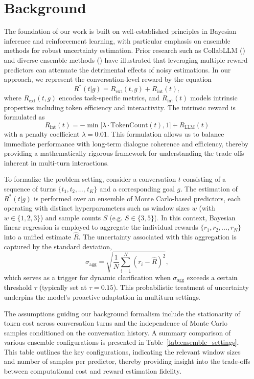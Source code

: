 \documentclass{article} %
\begin{document}
\section{Background}
The foundation of our work is built on well-established principles in Bayesian inference and reinforcement learning, with particular emphasis on ensemble methods for robust uncertainty estimation. Prior research such as CollabLLM (\cite{wu2025collabllm}) and diverse ensemble methods (\cite{nguyen2024laser}) have illustrated that leveraging multiple reward predictors can attenuate the detrimental effects of noisy estimations. In our approach, we represent the conversation-level reward by the equation 
\[
R^*(t|g) = R_{\text{ext}}(t, g) + R_{\text{int}}(t),
\]
where \(R_{\text{ext}}(t, g)\) encodes task-specific metrics, and \(R_{\text{int}}(t)\) models intrinsic properties including token efficiency and interactivity. The intrinsic reward is formulated as 
\[
R_{\text{int}}(t) = -\min\bigl[\lambda\cdot \text{TokenCount}(t), 1\bigr] + R_{\text{LLM}}(t)
\]
with a penalty coefficient \(\lambda=0.01\). This formulation allows us to balance immediate performance with long-term dialogue coherence and efficiency, thereby providing a mathematically rigorous framework for understanding the trade-offs inherent in multi-turn interactions.

To formalize the problem setting, consider a conversation \(t\) consisting of a sequence of turns \(\{t_1, t_2, \ldots, t_K\}\) and a corresponding goal \(g\). The estimation of \(R^*(t|g)\) is performed over an ensemble of Monte Carlo-based predictors, each operating with distinct hyperparameters such as window sizes \(w\) (with \(w \in \{1,2,3\}\)) and sample counts \(S\) (e.g. \(S \in \{3,5\}\)). In this context, Bayesian linear regression is employed to aggregate the individual rewards \(\{r_1, r_2, \ldots, r_N\}\) into a unified estimate \(\hat{R}\). The uncertainty associated with this aggregation is captured by the standard deviation,
\[
\sigma_{\text{agg}} = \sqrt{\frac{1}{N}\sum_{i=1}^N (r_i - \hat{R})^2},
\]
which serves as a trigger for dynamic clarification when \(\sigma_{\text{agg}}\) exceeds a certain threshold \(\tau\) (typically set at \(\tau=0.15\)). This probabilistic treatment of uncertainty underpins the model’s proactive adaptation in multiturn settings.

The assumptions guiding our background formalism include the stationarity of token cost across conversation turns and the independence of Monte Carlo samples conditioned on the conversation history. A summary comparison of various ensemble configurations is presented in Table~\ref{tab:ensemble_settings}. This table outlines the key configurations, indicating the relevant window sizes and number of samples per predictor, thereby providing insight into the trade-offs between computational cost and reward estimation fidelity.
\end{document}
